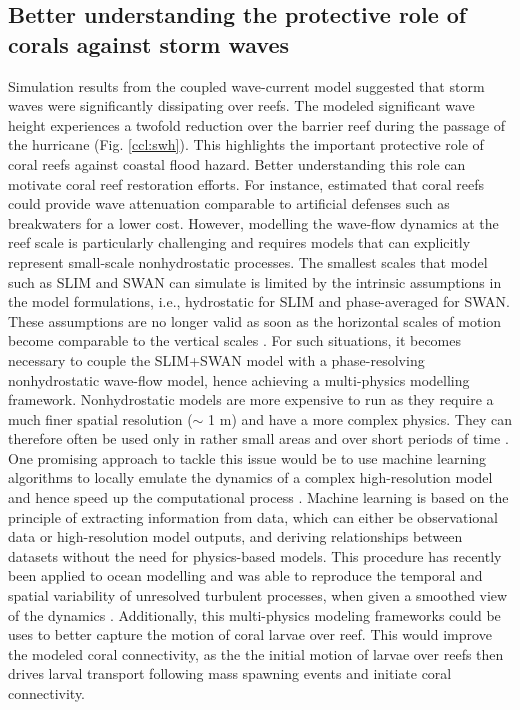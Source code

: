 \subsection*{Better understanding the protective role of corals against storm waves}
Simulation results from the coupled wave-current model suggested that storm waves were significantly dissipating over reefs. The modeled significant wave height experiences a twofold reduction over the barrier reef during the passage of the hurricane (Fig. \ref{ccl:swh}). This highlights the important protective role of coral reefs against coastal flood hazard. Better understanding this role can motivate coral reef restoration efforts. For instance, \citep{ferrario2014effectiveness} estimated that coral reefs could provide wave attenuation comparable to artificial defenses such as breakwaters for a lower cost. However, modelling the wave-flow dynamics at the reef scale is particularly challenging and requires models that can explicitly represent small-scale nonhydrostatic processes. The smallest scales that model such as SLIM and SWAN can simulate is limited by the intrinsic assumptions in the model formulations, i.e., hydrostatic for SLIM and phase-averaged for SWAN. These assumptions are no longer valid as soon as the horizontal scales of motion become comparable to the vertical scales \citep{marshall1997hydrostatic}. For such situations, it becomes necessary to couple the SLIM+SWAN model with a phase-resolving nonhydrostatic wave-flow model, hence achieving a multi-physics modelling framework. Nonhydrostatic models are more expensive to run as they require a much finer spatial resolution ($\sim$ 1 m) and have a more complex physics. They can therefore often be used only in rather small areas and over short periods of time \citep{fringer2019future}. One promising approach to tackle this issue would be to use machine learning algorithms to locally emulate the dynamics of a complex high-resolution model and hence speed up the computational process \citep{kasim2021building}. Machine learning is based on the principle of extracting information from data, which can either be observational data or high-resolution model outputs, and deriving relationships between datasets without the need for physics-based models. This procedure has recently been applied to ocean modelling and was able to reproduce the temporal and spatial variability of unresolved turbulent processes, when given a smoothed view of the dynamics \citep{bolton2019applications}. Additionally, this multi-physics modeling frameworks could be uses to better capture the motion of coral larvae over reef. This would improve the modeled coral connectivity, as the the initial motion of larvae over reefs then drives larval transport following mass spawning events and initiate coral connectivity. 

